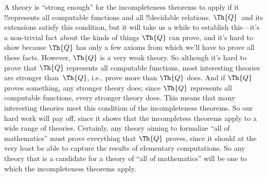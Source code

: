 \documentclass[../../../include/open-logic-section]{subfiles}
\begin{document}
A theory is ``strong enough'' for the incompleteness theorems to
apply if it !!{represents} all computable functions and all
!!{decidable} relations. $\Th{Q}$~and its extensions satisfy this
condition, but it will take us a while to establish this---it's a
non-trivial fact about the kinds of things $\Th{Q}$ can prove, and
it's hard to show because $\Th{Q}$ has only a few axioms from which
we'll have to prove all these facts. However, $\Th{Q}$ is a very weak
theory. So although it's hard to prove that $\Th{Q}$ represents all
computable functions, most interesting theories are stronger
than~$\Th{Q}$, i.e., prove more than $\Th{Q}$ does. And if $\Th{Q}$
proves something, any stronger theory does; since $\Th{Q}$ represents
all computable functions, every stronger theory does. This means that
many interesting theories meet this condition of the incompleteness
theorems. So our hard work will pay off, since it shows that the
incompletess theorems apply to a wide range of theories. Certainly,
any theory aiming to formalize ``all of mathematics'' must prove
everything that $\Th{Q}$ proves, since it should at the very least be
able to capture the results of elementary computations.  So any theory
that is a candidate for a theory of ``all of mathematics'' will be one
to which the incompleteness theorems apply.
\end{document}
